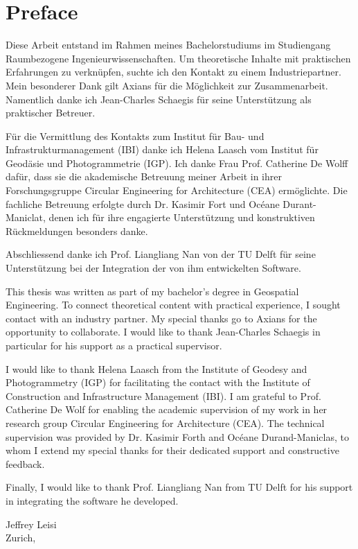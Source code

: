 \chapter*{Preface}


\begin{German}
    Diese Arbeit entstand im Rahmen meines Bachelorstudiums im Studiengang Raumbezogene Ingenieurwissenschaften. Um theoretische Inhalte mit praktischen Erfahrungen zu verknüpfen, suchte ich den Kontakt zu einem Industriepartner. Mein besonderer Dank gilt Axians für die Möglichkeit zur Zusammenarbeit. Namentlich danke ich Jean-Charles Schaegis für seine Unterstützung als praktischer Betreuer.

    Für die Vermittlung des Kontakts zum Institut für Bau- und Infrastrukturmanagement (IBI) danke ich Helena Laasch vom Institut für Geodäsie und Photogrammetrie (IGP). Ich danke Frau Prof. Catherine De Wolff dafür, dass sie die akademische Betreuung meiner Arbeit in ihrer Forschungsgruppe Circular Engineering for Architecture (CEA) ermöglichte. Die fachliche Betreuung erfolgte durch Dr. Kasimir Fort und Océane Durant-Maniclat, denen ich für ihre engagierte Unterstützung und konstruktiven Rückmeldungen besonders danke.

    Abschliessend danke ich Prof. Liangliang Nan von der TU Delft für seine Unterstützung bei der Integration der von ihm entwickelten Software.
\end{German}

\begin{English}
    This thesis was written as part of my bachelor's degree in Geospatial Engineering. To connect theoretical content with practical experience, I sought contact with an industry partner. My special thanks go to Axians for the opportunity to collaborate. I would like to thank Jean-Charles Schaegis in particular for his support as a practical supervisor.

    I would like to thank Helena Laasch from the Institute of Geodesy and Photogrammetry (IGP) for facilitating the contact with the Institute of Construction and Infrastructure Management (IBI). I am grateful to Prof. Catherine De Wolf for enabling the academic supervision of my work in her research group Circular Engineering for Architecture (CEA). The technical supervision was provided by Dr. Kasimir Forth and Océane Durand-Maniclas, to whom I extend my special thanks for their dedicated support and constructive feedback.

    Finally, I would like to thank Prof. Liangliang Nan from TU Delft for his support in integrating the software he developed.
\end{English}

\begin{flushright}
Jeffrey Leisi \\
Zurich, \the\year
\end{flushright}